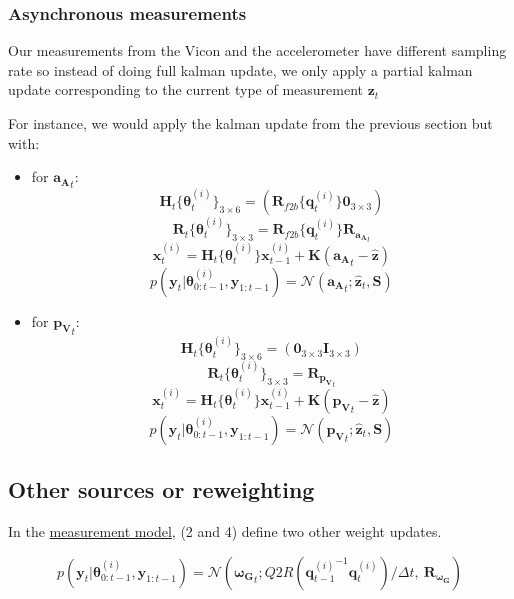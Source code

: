 \documentclass[]{article}
\begin{document}
\subsubsection{Asynchronous
measurements}\label{asynchronous-measurements}

Our measurements from the Vicon and the accelerometer have different
sampling rate so instead of doing full kalman update, we only apply a
partial kalman update corresponding to the current type of measurement
\(\mathbf{z}_t\)

For instance, we would apply the kalman update from the previous section
but with:

\begin{itemize}
\item
  for \(\mathbf{a_A}_t\):
  \[\mathbf{H}_t\{\boldsymbol{\theta}^{(i)}_t\}_{3 \times 6} = (\mathbf{R}_{f2b}\{\mathbf{q}^{(i)}_{t}\} \mathbf{0}_{3 \times 3})\]
  \[\mathbf{R}_t\{\boldsymbol{\theta}^{(i)}_t\}_{3 \times 3} = \mathbf{R}_{f2b}\{\mathbf{q}^{(i)}_{t}\}\mathbf{R}_{\mathbf{a_A}_t } \]
  \[\mathbf{x}^{(i)}_t = \mathbf{H}_t\{\boldsymbol{\theta}^{(i)}_t\} \mathbf{x}^{(i)}_{t-1} + \mathbf{K}(\mathbf{a_A}_t - \hat{\mathbf{z}})\]
  \[p(\mathbf{y}_t | \boldsymbol{\theta}^{(i)}_{0:t-1}, \mathbf{y}_{1:t-1}) = \mathcal{N}(\mathbf{a_A}_t; \hat{\mathbf{z}}_t, \mathbf{S})\]
\item
  for \(\mathbf{p_V}_t\):
  \[\mathbf{H}_t\{\boldsymbol{\theta}^{(i)}_t\}_{3 \times 6} = (\mathbf{0}_{3 \times 3} \mathbf{I}_{3 \times 3} )\]
  \[\mathbf{R}_t\{\boldsymbol{\theta}^{(i)}_t\}_{3 \times 3} =  \mathbf{R}_{\mathbf{p_V}_t }\]
  \[\mathbf{x}^{(i)}_t = \mathbf{H}_t\{\boldsymbol{\theta}^{(i)}_t\} \mathbf{x}^{(i)}_{t-1} + \mathbf{K}(\mathbf{p_V}_t - \hat{\mathbf{z}})\]
  \[p(\mathbf{y}_t | \boldsymbol{\theta}^{(i)}_{0:t-1}, \mathbf{y}_{1:t-1}) = \mathcal{N}(\mathbf{p_V}_t; \hat{\mathbf{z}}_t, \mathbf{S})\]
\end{itemize}

\subsection{Other sources or
reweighting}\label{other-sources-or-reweighting}

In the \protect\hyperlink{measurements-model}{measurement model}, (2 and
4) define two other weight updates.

\[p(\mathbf{y}_t | \boldsymbol{\theta}^{(i)}_{0:t-1}, \mathbf{y}_{1:t-1}) = \mathcal{N}(\mathbf{\boldsymbol{\omega}_G}_t; Q2R({\mathbf{q}^{(i)}_{t-1}}^{-1}\mathbf{q}^{(i)}_t)/\Delta t,~ \mathbf{R}_{\mathbf{\boldsymbol{\omega}_G}})\]
\end{document}
